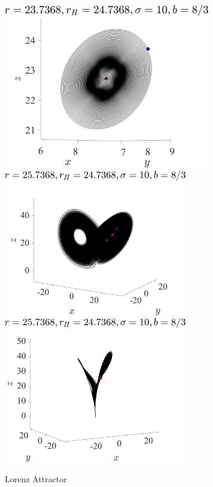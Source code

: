 \documentclass[11pt]{article}
\begin{document}
\begin{figure}[h]
\centering
\includegraphics[width=9cm]{Lorenz_r23.7368.png}
\includegraphics[width=8cm]{Lorenz_r25.7368.png}
\includegraphics[width=8cm]{Lorenz_r25.7368_2.png}
\caption{Lorenz Attractor}
\end{figure}
\end{document}
